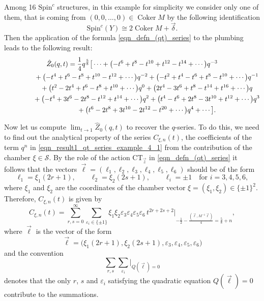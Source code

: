 \documentclass[pdftex]{sigma}
\numberwithin{equation}{section}
\begin{document}
\begin{Example}
Among 16 $ \text{Spin}^c $ structures, in this example for simplicity we consider only one of them, that is coming from $ (0, 0, \dots, 0)\in \operatorname{Coker} M $ by the following identification
	\[
	\text{Spin}^c(Y)\cong 2\operatorname{Coker}M+\vec{\delta}.
	\]
	Then the application of the formula \eqref{eqn_defn_(qt)_series} to the plumbing leads to the following result:
	\begin{gather}
			\hat{Z}_0(q,t)= \frac{1}{4}q^{\frac{5}{8}}\big[\cdots+\big({-}t^6+t^8-t^{10}+t^{12}-t^{14}+\cdots\big)q^{-3}\nonumber\\
\hphantom{\hat{Z}_0(q,t)=}{}
+\big({-}t^{4}+t^6-t^{8}+t^{10}-t^{12}+\cdots\big)q^{-2}+\big({-}t^2+t^4-t^6+t^{8}-t^{10}+\cdots\big)q^{-1}\nonumber\\
\hphantom{\hat{Z}_0(q,t)=}{} +\big(t^2-2t^4+t^{6}-t^{8}+t^{10}+\cdots\big)q^0+\big(2t^4-3t^6+t^{8}-t^{14}+t^{16}+\cdots\big)q\nonumber\\
\hphantom{\hat{Z}_0(q,t)=}{}+\big({-}t^4+3t^6-2t^8-t^{12}+t^{14}+\cdots\big)q^2+\big(t^4-t^6+2t^8-3t^{10}+t^{12}+\cdots\big)q^3\nonumber\\
\hphantom{\hat{Z}_0(q,t)=}{}+\big(t^{6}-2t^8+3t^{10}-2t^{12}-t^{20}+\cdots\big)q^4+\cdots\big].\label{eqn_result1_qt_series_example_4_1}
		\end{gather}
	
	Now let us compute $ \lim_{t\rightarrow 1} \hat{Z}_0(q,t)$ to recover the $ q $-series. To do this, we need to find out the analytical property of the series $ C_{\xi,n}(t) $, the coefficients of the term $ q^{n} $ in \eqref{eqn_result1_qt_series_example_4_1} from the contribution of the chamber $ \xi\in \mathcal{S} $. By the role of the action $ \text{CT}_{\vec{z}} $ in \eqref{eqn_defn_(qt)_series} it follows that the vectors $ \vec{\ell}=(\ell_1,\ell_2,\ell_3,\ell_4,\ell_5,\ell_6) $ should be of the form
	\[
	\ell_1=\xi_1(2r+1), \qquad\ell_2=\xi_2(2s+1), \qquad\ell_i=\pm1  \quad \text{for } i=3,4,5,6,
	\]
	where $ \xi_1 $ and $ \xi_2 $ are the coordinates of the chamber vector $ \xi=(\xi_1,\xi_2)\in \{\pm 1\}^2 $. Therefore, $ C_{\xi,n}(t) $ is given by
	\begin{equation}\label{eqn_t_series_indefinite_example1}
		C_{\xi,n}(t)= \sum_{r,s=0}^{\infty}\sum_{\varepsilon_i\in\{\pm1\}} \xi_1\xi_2\varepsilon_3\varepsilon_4\varepsilon_5\varepsilon_6 \,t^{2r+2s+2} \Big|_{-\frac{1}{2}-\frac{(\vec{\ell},M^{-1}\vec{\ell})}{4}=\frac{5}{8}+n},
	\end{equation}
	where $ \vec{\ell} $ is the vector of the form
	\[
	\vec{\ell}=\big(\xi_1(2r+1), \xi_2(2s+1), \varepsilon_3,\varepsilon_4,\varepsilon_5,\varepsilon_6\big)
	\]
	and the convention
	\[
 \sum_{r,s}\sum_{\varepsilon_i}\Big|_{Q(\vec{\ell})=0}
	\]
	denotes that the only $ r$, $s $ and $ \varepsilon_i $ satisfying the quadratic equation $ Q(\vec{\ell})=0 $ contribute to the summations.
	

\end{Example}
\end{document}
